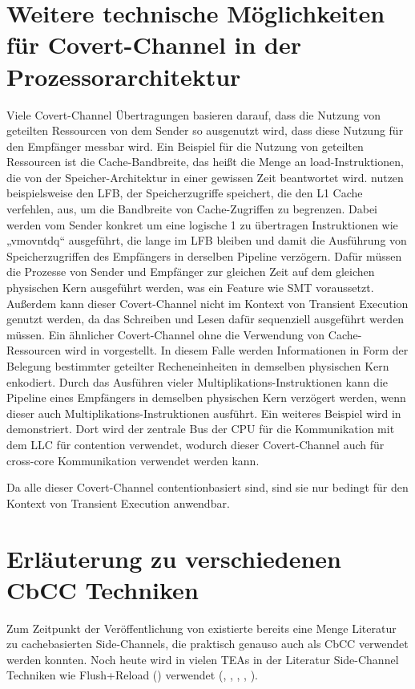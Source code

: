 \section{Weitere technische Möglichkeiten für Covert-Channel in
der Prozessorarchitektur}
\label{appendix:advanced-cbcc}
Viele Covert-Channel Übertragungen basieren darauf, dass die Nutzung
von geteilten Ressourcen von dem Sender so ausgenutzt wird, dass
diese Nutzung für den Empfänger messbar wird. Ein Beispiel für
die Nutzung von geteilten Ressourcen ist die Cache-Bandbreite,
das heißt die Menge an load-Instruktionen, die von der
Speicher-Architektur in einer gewissen Zeit beantwortet wird.
\cite{wang_bandwidthbreach_2023} nutzen beispielsweise den
\ac{LFB}, der Speicherzugriffe speichert, die den L1 Cache
verfehlen, aus, um die Bandbreite von Cache-Zugriffen zu
begrenzen. Dabei werden vom Sender konkret um eine logische 1 zu
übertragen Instruktionen wie „vmovntdq“ ausgeführt, die lange
im \ac{LFB} bleiben und damit die Ausführung von Speicherzugriffen
des Empfängers in derselben Pipeline verzögern. Dafür
müssen die Prozesse von Sender und Empfänger zur gleichen Zeit
auf dem gleichen physischen Kern ausgeführt werden, was ein
Feature wie \ac{SMT} voraussetzt. Außerdem kann dieser
Covert-Channel nicht im Kontext von Transient Execution genutzt
werden, da das Schreiben und Lesen dafür sequenziell ausgeführt
werden müssen. Ein ähnlicher Covert-Channel ohne die Verwendung
von Cache-Ressourcen wird in \cite[2]{wang_covert_2006} vorgestellt.
In diesem Falle werden Informationen in Form der Belegung
bestimmter geteilter Recheneinheiten in demselben physischen Kern
enkodiert. Durch das Ausführen vieler
Multiplikations-Instruktionen kann die Pipeline eines Empfängers
in demselben physischen Kern verzögert werden, wenn dieser auch
Multiplikations-Instruktionen ausführt.
Ein weiteres Beispiel wird in \cite[9,10]{paccagnella_lord_2021}
demonstriert. Dort wird der zentrale Bus der \ac{CPU} für die
Kommunikation mit dem \ac{LLC} für contention verwendet, wodurch
dieser Covert-Channel auch für cross-core Kommunikation verwendet
werden kann.

Da alle dieser Covert-Channel contentionbasiert sind, sind sie
nur bedingt für den Kontext von Transient Execution anwendbar.

\section{Erläuterung zu verschiedenen \ac{CbCC} Techniken}
\label{appendix:cbcc-techniques}
Zum Zeitpunkt der Veröffentlichung von
 existierte bereits eine Menge
Literatur zu cachebasierten Side-Channels, die praktisch genauso
auch als \ac{CbCC} verwendet werden konnten. Noch heute wird in
vielen \acp{TEA} in der Literatur
Side-Channel Techniken wie Flush+Reload
(\cite{yarom_flushreload_2014}) verwendet
(\cite[7]{schwarz_zombieload_2019}, \cite[91]{van_schaik_ridl_2019},
\cite[6]{kim_flop_2025}, \cite[6]{kim_slap_2025},
\cite[3]{hertogh_rain_nodate}).

